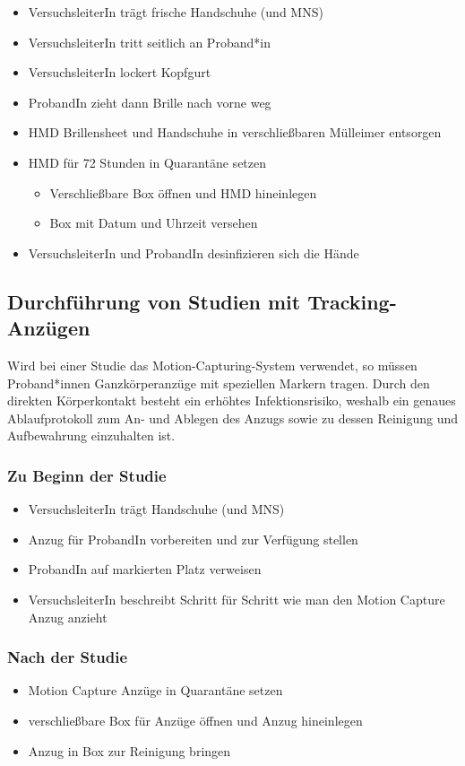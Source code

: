 {
\singlespacing
\begin{itemize}
    \item VersuchsleiterIn trägt frische Handschuhe (und MNS)
    \item VersuchsleiterIn tritt seitlich an Proband*in
    \item VersuchsleiterIn lockert Kopfgurt
    \item ProbandIn zieht dann Brille nach vorne weg
    \item HMD Brillensheet und Handschuhe in verschließbaren Mülleimer entsorgen
    \item HMD für 72 Stunden in Quarantäne setzen
    \begin{itemize}
        \item Verschließbare Box öffnen und HMD hineinlegen
        \item Box mit Datum und Uhrzeit versehen
    \end{itemize}
    \item VersuchsleiterIn und ProbandIn desinfizieren sich die Hände
\end{itemize}
}

\subsection{Durchführung von Studien mit Tracking-Anzügen}\label{subsec:nutzerstudien_mocap}

Wird bei einer Studie das Motion-Capturing-System verwendet, so müssen Proband*innen Ganzkörperanzüge mit speziellen Markern tragen.
Durch den direkten Körperkontakt besteht ein erhöhtes Infektionsrisiko, weshalb ein genaues Ablaufprotokoll zum An- und Ablegen des Anzugs sowie zu dessen Reinigung und Aufbewahrung einzuhalten ist.

\subsubsection*{Zu Beginn der Studie}

{
\singlespacing
\begin{itemize}
    \item VersuchsleiterIn trägt Handschuhe (und MNS)
    \item Anzug für ProbandIn vorbereiten und zur Verfügung stellen
    \item ProbandIn auf markierten Platz verweisen 
    \item VersuchsleiterIn beschreibt Schritt für Schritt wie man den Motion Capture Anzug anzieht
\end{itemize}
}

\subsubsection*{Nach der Studie}

{
\singlespacing
\begin{itemize}
    \item Motion Capture Anzüge in Quarantäne setzen
    \item verschließbare Box für Anzüge öffnen und Anzug hineinlegen
    \item Anzug in Box zur Reinigung bringen
\end{itemize}
}
